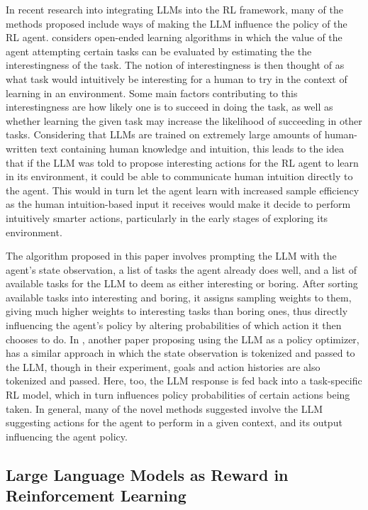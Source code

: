 \documentclass[conference]{IEEEtran}
\begin{document}
In recent research into integrating LLMs into the RL framework, many of the methods proposed include ways of making the LLM influence the policy of the RL agent. \cite{omni} considers open-ended learning algorithms in which the value of the agent attempting certain tasks can be evaluated by estimating the the interestingness of the task. The notion of interestingness is then thought of as what task would intuitively be interesting for a human to try in the context of learning in an environment. Some main factors contributing to this interestingness are how likely one is to succeed in doing the task, as well as whether learning the given task may increase the likelihood of succeeding in other tasks. Considering that LLMs are trained on extremely large amounts of human-written text containing human knowledge and intuition, this leads to the idea that if the LLM was told to propose interesting actions for the RL agent to learn in its environment, it could be able to communicate human intuition directly to the agent. This would in turn let the agent learn with increased sample efficiency as the human intuition-based input it receives would make it decide to perform intuitively smarter actions, particularly in the early stages of exploring its environment.

The algorithm proposed in this paper involves prompting the LLM with the agent's state observation, a list of tasks the agent already does well, and a list of available tasks for the LLM to deem as either interesting or boring. After sorting available tasks into interesting and boring, it assigns sampling weights to them, giving much higher weights to interesting tasks than boring ones, thus directly influencing the agent's policy by altering probabilities of which action it then chooses to do. In \cite{idm}, another paper proposing using the LLM as a policy optimizer, has a similar approach in which the state observation is tokenized and passed to the LLM, though in their experiment, goals and action histories are also tokenized and passed. Here, too, the LLM response is fed back into a task-specific RL model, which in turn influences policy probabilities of certain actions being taken. In general, many of the novel methods suggested involve the LLM suggesting actions for the agent to perform in a given context, and its output influencing the agent policy. 

\subsection{Large Language Models as Reward in Reinforcement Learning}
\end{document}
